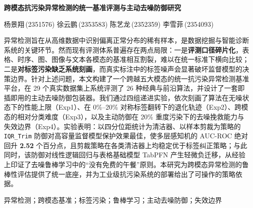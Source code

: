\begin{center}
    \vspace*{0.5em}
    {\LARGE\heiti\bfseries 跨模态抗污染异常检测的统一基准评测与主动去噪防御研究 \par}
    \vspace{0.6em}
    {\normalsize 杨景翔\,(2351576) \quad 徐云鹏\,(2353583) \quad 陈艺龙\,(2352359) \quad 李雪菲\,(2354093) \par}
    \vspace{1.0em}
\end{center}

\begin{minipage}{\textwidth}
\small
{}\;
异常检测旨在从高维数据中识别偏离正常分布的稀有样本，是数据挖掘与智能诊断系统的关键环节。然而现有评测体系普遍存在两点局限：一是\textbf{评测口径碎片化}，表格、时序、图、图像与文本各模态的基准相互割裂，难以在统一标准下横向比较；二是\textbf{对标签污染缺乏系统刻画}，而真实标注中的标签噪声会显著破坏监督模型的决策边界。针对上述问题，本文构建了一个跨越五大模态的统一抗污染异常检测基准平台，在 29 个真实数据集上系统评测了 26 种经典与前沿算法，并设计了一套即插即用的主动去噪防御包装器。我们通过四组递进实验，依次刻画了算法在无噪状态下的性能上限（Exp1）、在 0\%--20\% 对称标签翻转下的退化轨迹（Exp2）、跨模态的相对分类难度（Exp3），以及主动防御在 20\% 重度污染下的去噪挽救能力与失效边界（Exp4）。实验表明：以四分位距统计为清洁器、以样本剪裁为策略的 \texttt{IQR\_Trim} 防御对高容量监督模型保护效果最佳，使多层感知机的 AUC-ROC 绝对回升 \textbf{2.52} 个百分点，且剪裁策略在各类清洁器上均稳定优于标签纠正策略；与此同时，该防御对线性逻辑回归与表格基础模型 TabPFN 产生轻微负迁移，从经验上印证了去噪鲁棒学习中的“没有免费的午餐”原则。本研究为跨模态异常检测的鲁棒性评估提供了统一底座，并为工业级抗污染系统的部署给出了可操作的策略依据。\par
\vspace{0.4em}
\;异常检测；\;跨模态基准；\;标签污染；\;鲁棒学习；\;主动去噪防御；\;失效边界\par


\end{minipage}
